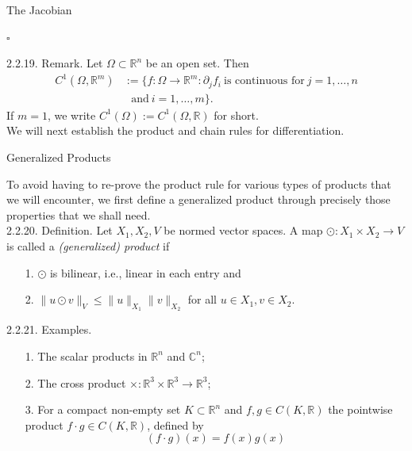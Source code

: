 \documentclass[smaller,hyperref={CJKbookmarks=true}]{beamer}
\newcommand{\C}{\mathbb{C}} \newcommand{\F}{\mathbb{F}} \newcommand{\R}{\mathbb{R}} \newcommand{\Q}{\mathbb{Q}}
\begin{document}
\begin{frame}{The Jacobian}
\begin{spacing}{1}
\begin{flushright}
  $\square$
\end{flushright}
\newpage
\alert{2.2.19. Remark.} Let $\Omega\subset\R^n$ be an open set. Then
\begin{equation*}
  \begin{split}
     C^1(\Omega,\R^m) &:=\{f:\Omega\to\R^m:\partial_jf_i~\text{is continuous for}~j=1,\ldots,n \\
       &~~~\text{and}~i=1,\ldots,m\}.
  \end{split}
\end{equation*}
If $m=1$, we write $C^1(\Omega):=C^1(\Omega,\R)$ for short.\\[6pt]
We will next establish the product and chain rules for dif{}ferentiation.
\end{spacing}
\end{frame}
\begin{frame}[t]{Generalized Products}
 \begin{spacing}{1.05}
   To avoid having to re-prove the product rule for various types of products
that we will encounter, we first define a generalized product through
precisely those properties that we shall need.\\[6pt]
\alert{2.2.20. Definition.} Let $X_1,X_2,V$ be normed vector spaces. A map $\odot:X_1\times X_2\to V$ is called a \emph{(generalized) product} if
\begin{itemize}
  \item[1.] $\odot$ is bilinear, i.e., linear in each entry and
  \item[2.] $\|u\odot v\|_V\leq\|u\|_{X_1}\|v\|_{X_2}$ for all $u\in X_1,v\in X_2$.
\end{itemize}
\alert{2.2.21. Examples.}
\begin{itemize}
  \item[1.] The scalar products in $\R^n$ and $\C^n$;
  \item[2.] The cross product $\times:\R^3\times\R^3\to\R^3$;
  \item[3.] For a compact non-empty set $K\subset\R^n$ and $f,g\in C(K,\R)$ the pointwise product $f\cdot g\in C(K,\R)$, defined by
      \[(f\cdot g)(x)=f(x)g(x)\]
\end{itemize}
 \end{spacing}
\end{frame}
\end{document}
